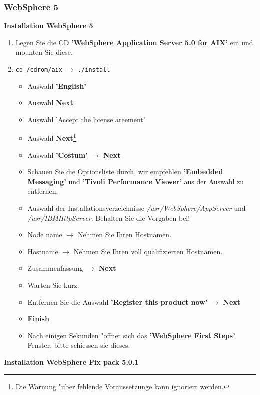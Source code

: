 \subsubsection{WebSphere 5}
%
{\bf Installation WebSphere 5}\\[1ex]
\begin{enumerate}
\item Legen Sie die CD {\bf 'WebSphere Application Server 5.0 for AIX'} ein und mounten Sie diese.
\item {\tt cd /cdrom/aix} $\rightarrow$ {\tt ./install}
\begin{itemize}
\item Auswahl {\bf 'English'}
\item Auswahl {\bf Next}
\item Auswahl 'Accept the license areement'
\item Auswahl {\bf Next}\footnote{Die Warnung "uber fehlende Voraussetzunge kann ignoriert werden.}
\item Auswahl {\bf 'Costum'} $\rightarrow$ {\bf Next}
\item Schauen Sie die Optionsliste durch, wir empfehlen {\bf 'Embedded Messaging'} und {\bf 'Tivoli Performance Viewer'} aus der Auswahl zu entfernen.
\item Auswahl der Installationsverzeichnisse {\it /usr/WebSphere/AppServer} und {\it /usr/IBMHttpServer}. Behalten Sie die Vorgaben bei!
\item Node name $\rightarrow$ Nehmen Sie Ihren Hostnamen.
\item Hostname $\rightarrow$ Nehmen Sie Ihren voll qualifizierten Hostnamen.
\item Zusammenfassung $\rightarrow$ {\bf Next}
\item Warten Sie kurz.
\item Entfernen Sie die Auswahl {\bf 'Register this product now'} $\rightarrow$ {\bf Next}
\item {\bf Finish}
\item Nach einigen Sekunden "offnet sich das {\bf 'WebSphere First Steps'} Fenster, bitte schiessen sie dieses.
\end{itemize}
\end{enumerate}
%
{\bf Installation WebSphere Fix pack 5.0.1}\\[1ex]
